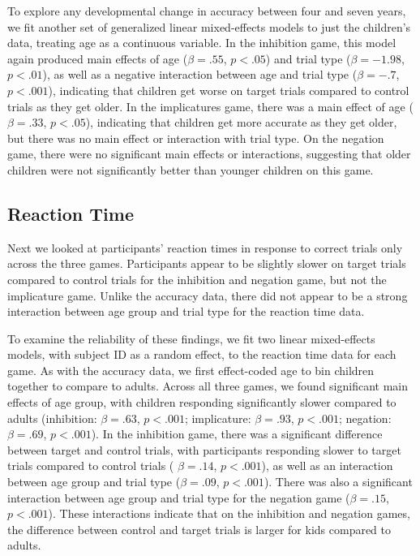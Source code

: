 \documentclass[10pt,letterpaper]{article}
\begin{document}
To explore any developmental change in accuracy between four and seven years, we fit another set of generalized linear mixed-effects models to just the children's data, treating age as a continuous variable.  In the inhibition game, this model again produced main effects of age ($\beta = .55$, $p< .05$) and trial type ($\beta = -1.98$, $p< .01$), as well as a negative interaction between age and trial type ($\beta = -.7$, $p< .001$), indicating that children get worse on target trials compared to control trials as they get older.  In the implicatures game, there was a main effect of age ($\beta = .33$, $p< .05$), indicating that children get more accurate as they get older, but there was no main effect or interaction with trial type.  On the negation game, there were no significant main effects or interactions, suggesting that older children were not significantly better than younger children on this game.

\subsection{Reaction Time}

Next we looked at participants' reaction times in response to correct trials only across the three games.  Participants appear to be slightly slower on target trials compared to control trials for the inhibition and negation game, but not the implicature game.  Unlike the accuracy data, there did not appear to be a strong interaction between age group and trial type for the reaction time data.  

To examine the reliability of these findings, we fit two linear mixed-effects models, with subject ID as a random effect, to the reaction time data for each game.  As with the accuracy data, we first effect-coded age to bin children together to compare to adults.  Across all three games, we found significant main effects of age group, with children responding significantly slower compared to adults (inhibition: $\beta = .63$, $p< .001$; implicature: $\beta = .93$, $p< .001$; negation: $\beta = .69$, $p< .001$).  In the inhibition game, there was a significant difference between target and control trials, with participants responding slower to target trials compared to control trials ( $\beta = .14$, $p< .001$), as well as an interaction between age group and trial type ($\beta = .09$, $p< .001$).  There was also a significant interaction between age group and trial type for the negation game ($\beta = .15$, $p< .001$).  These interactions indicate that on the inhibition and negation games, the difference between control and target trials is larger for kids compared to adults.  
\end{document}
